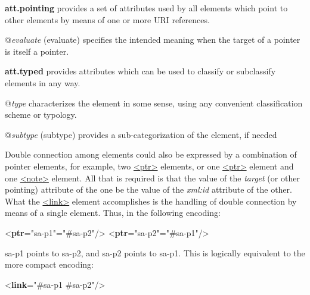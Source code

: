 \begin{sansreflist}
  
\item [\textbf{att.pointing}] provides a set of attributes used by all elements which point to other elements by means of one or more URI references.\hfil\\[-10pt]\begin{sansreflist}
    \item[@{\itshape evaluate}]
  (evaluate) specifies the intended meaning when the target of a pointer is itself a pointer.
\end{sansreflist}  
\item [\textbf{att.typed}] provides attributes which can be used to classify or subclassify elements in any way.\hfil\\[-10pt]\begin{sansreflist}
    \item[@{\itshape type}]
  characterizes the element in some sense, using any convenient classification scheme or typology.
    \item[@{\itshape subtype}]
  (subtype) provides a sub-categorization of the element, if needed
\end{sansreflist}  
\end{sansreflist}
\par
Double connection among elements could also be expressed by a combination of pointer elements, for example, two \hyperref[TEI.ptr]{<ptr>} elements, or one \hyperref[TEI.ptr]{<ptr>} element and one \hyperref[TEI.note]{<note>} element. All that is required is that the value of the {\itshape target} (or other pointing) attribute of the one be the value of the {\itshape xml:id} attribute of the other. What the \hyperref[TEI.link]{<link>} element accomplishes is the handling of double connection by means of a single element. Thus, in the following encoding: \par\bgroup{}\exampleFont \begin{shaded}\noindent\mbox{}{<\textbf{ptr}\hspace*{1em}{xml:id}="{sa-p1}"\hspace*{1em}{target}="{\#sa-p2}"/>}\mbox{}\newline 
{<\textbf{ptr}\hspace*{1em}{xml:id}="{sa-p2}"\hspace*{1em}{target}="{\#sa-p1}"/>}\end{shaded}\egroup\par \noindent  sa-p1 points to sa-p2, and sa-p2 points to sa-p1. This is logically equivalent to the more compact encoding: \par\bgroup{}\exampleFont \begin{shaded}\noindent\mbox{}{<\textbf{link}\hspace*{1em}{target}="{\#sa-p1 \#sa-p2}"/>}\end{shaded}\egroup\par \par
